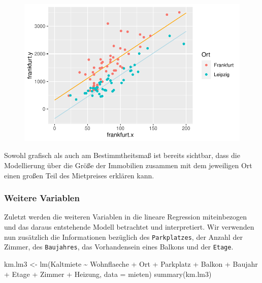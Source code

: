 \documentclass[
  a4paper,
  DIV=11]{scrartcl}
\newenvironment{Shaded}{\begin{snugshade}}{\end{snugshade}}
\newcommand{\AttributeTok}[1]{\textcolor[rgb]{0.40,0.45,0.13}{#1}}
\newcommand{\FunctionTok}[1]{\textcolor[rgb]{0.28,0.35,0.67}{#1}}
\newcommand{\NormalTok}[1]{\textcolor[rgb]{0.00,0.23,0.31}{#1}}
\newcommand{\OtherTok}[1]{\textcolor[rgb]{0.00,0.23,0.31}{#1}}
\newcommand{\SpecialCharTok}[1]{\textcolor[rgb]{0.37,0.37,0.37}{#1}}
\begin{document}
\begin{figure}[H]

{\centering \includegraphics{Mietmodellierung_files/figure-pdf/unnamed-chunk-28-1.pdf}

}

\end{figure}

Sowohl grafisch als auch am Bestimmtheitsmaß ist bereits sichtbar, dass
die Modellierung über die Größe der Immobilien zusammen mit dem
jeweiligen Ort einen großen Teil des Mietpreises erklären kann.

\hypertarget{weitere-variablen}{%
\subsubsection{Weitere Variablen}\label{weitere-variablen}}

Zuletzt werden die weiteren Variablen in die lineare Regression
miteinbezogen und das daraus entstehende Modell betrachtet und
interpretiert. Wir verwenden nun zusätzlich die Informationen bezüglich
des \texttt{Parkplatzes}, der Anzahl der Zimmer, des \texttt{Baujahres},
das Vorhandensein eines Balkons und der \texttt{Etage}.

\begin{Shaded}
\begin{Highlighting}[]
\NormalTok{km.lm3 }\OtherTok{\textless{}{-}} \FunctionTok{lm}\NormalTok{(Kaltmiete }\SpecialCharTok{\textasciitilde{}}\NormalTok{ Wohnflaeche }\SpecialCharTok{+}\NormalTok{ Ort }\SpecialCharTok{+}\NormalTok{ Parkplatz }\SpecialCharTok{+}\NormalTok{ Balkon }\SpecialCharTok{+}\NormalTok{ Baujahr }\SpecialCharTok{+} 
\NormalTok{               Etage }\SpecialCharTok{+}\NormalTok{ Zimmer }\SpecialCharTok{+}\NormalTok{ Heizung, }\AttributeTok{data =}\NormalTok{ mieten)}
\FunctionTok{summary}\NormalTok{(km.lm3)}
\end{Highlighting}
\end{Shaded}
\end{document}

